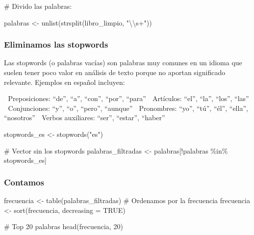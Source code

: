 \documentclass[
  letterpaper,
  DIV=11,
  numbers=noendperiod]{scrreprt}
\newenvironment{Shaded}{\begin{snugshade}}{\end{snugshade}}
\newcommand{\AttributeTok}[1]{\textcolor[rgb]{0.40,0.45,0.13}{#1}}
\newcommand{\CommentTok}[1]{\textcolor[rgb]{0.37,0.37,0.37}{#1}}
\newcommand{\ConstantTok}[1]{\textcolor[rgb]{0.56,0.35,0.01}{#1}}
\newcommand{\DecValTok}[1]{\textcolor[rgb]{0.68,0.00,0.00}{#1}}
\newcommand{\FunctionTok}[1]{\textcolor[rgb]{0.28,0.35,0.67}{#1}}
\newcommand{\NormalTok}[1]{\textcolor[rgb]{0.00,0.23,0.31}{#1}}
\newcommand{\OtherTok}[1]{\textcolor[rgb]{0.00,0.23,0.31}{#1}}
\newcommand{\SpecialCharTok}[1]{\textcolor[rgb]{0.37,0.37,0.37}{#1}}
\newcommand{\StringTok}[1]{\textcolor[rgb]{0.13,0.47,0.30}{#1}}
\begin{document}
\begin{Shaded}
\begin{Highlighting}[]
\CommentTok{\# Divido las palabras:}

\NormalTok{palabras }\OtherTok{\textless{}{-}} \FunctionTok{unlist}\NormalTok{(}\FunctionTok{strsplit}\NormalTok{(libro\_limpio, }\StringTok{"}\SpecialCharTok{\textbackslash{}\textbackslash{}}\StringTok{s+"}\NormalTok{)) }
\end{Highlighting}
\end{Shaded}

\subsubsection{Eliminamos las stopwords}\label{eliminamos-las-stopwords}

Las stopwords (o palabras vacías) son palabras muy comunes en un idioma
que suelen tener poco valor en análisis de texto porque no aportan
significado relevante. Ejemplos en español incluyen:

🔹 Preposiciones: ``de'', ``a'', ``con'', ``por'', ``para'' 🔹
Artículos: ``el'', ``la'', ``los'', ``las'' 🔹 Conjunciones: ``y'',
``o'', ``pero'', ``aunque'' 🔹 Pronombres: ``yo'', ``tú'', ``él'',
``ella'', ``nosotros'' 🔹 Verbos auxiliares: ``ser'', ``estar'',
``haber''

\begin{Shaded}
\begin{Highlighting}[]
\NormalTok{stopwords\_es }\OtherTok{\textless{}{-}} \FunctionTok{stopwords}\NormalTok{(}\StringTok{"es"}\NormalTok{) }

\CommentTok{\# Vector sin los stopwords}
\NormalTok{palabras\_filtradas }\OtherTok{\textless{}{-}}\NormalTok{ palabras[}\SpecialCharTok{!}\NormalTok{palabras }\SpecialCharTok{\%in\%}\NormalTok{ stopwords\_es] }
\end{Highlighting}
\end{Shaded}

\subsubsection{Contamos}\label{contamos}

\begin{Shaded}
\begin{Highlighting}[]
\NormalTok{frecuencia }\OtherTok{\textless{}{-}} \FunctionTok{table}\NormalTok{(palabras\_filtradas)}
\CommentTok{\# Ordenamos por la frecuencia}
\NormalTok{frecuencia }\OtherTok{\textless{}{-}} \FunctionTok{sort}\NormalTok{(frecuencia, }\AttributeTok{decreasing =} \ConstantTok{TRUE}\NormalTok{) }

\CommentTok{\# Top 20 palabras}
\FunctionTok{head}\NormalTok{(frecuencia, }\DecValTok{20}\NormalTok{)}
\end{Highlighting}
\end{Shaded}
\end{document}
